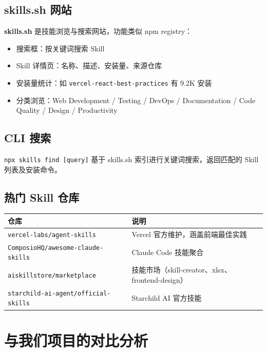\documentclass[11pt,a4paper]{article}
\begin{document}
\subsection{skills.sh 网站}

\textbf{skills.sh} 是技能浏览与搜索网站，功能类似 npm registry：

\begin{itemize}[nosep]
  \item 搜索框：按关键词搜索 Skill
  \item Skill 详情页：名称、描述、安装量、来源仓库
  \item 安装量统计：如 \texttt{vercel-react-best-practices} 有 9.2K 安装
  \item 分类浏览：Web Development / Testing / DevOps / Documentation / Code Quality / Design / Productivity
\end{itemize}

\subsection{CLI 搜索}

\texttt{npx skills find [query]} 基于 skills.sh 索引进行关键词搜索，返回匹配的 Skill 列表及安装命令。

\subsection{热门 Skill 仓库}

\begin{table}[h]
\centering
\begin{tabularx}{\linewidth}{lX}
\toprule
\textbf{仓库} & \textbf{说明} \\
\midrule
\texttt{vercel-labs/agent-skills} & Vercel 官方维护，涵盖前端最佳实践 \\
\texttt{ComposioHQ/awesome-claude-skills} & Claude Code 技能聚合 \\
\texttt{aiskillstore/marketplace} & 技能市场（skill-creator、xlsx、frontend-design） \\
\texttt{starchild-ai-agent/official-skills} & Starchild AI 官方技能 \\
\bottomrule
\end{tabularx}
\end{table}

\section{与我们项目的对比分析}
\end{document}

